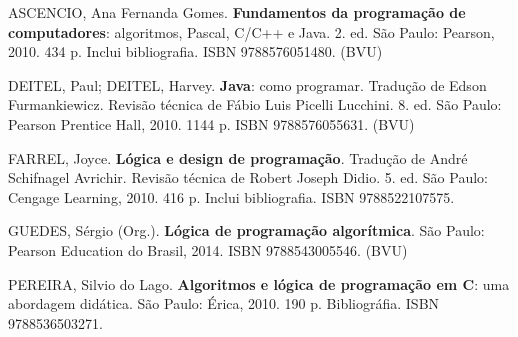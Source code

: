 \begin{pud}
\begin{bibbasica}
	\end{bibbasica}
	
	\begin{bibcomplementar}
	
		\item ASCENCIO, Ana Fernanda Gomes. \textbf{Fundamentos da programação de computadores}: algoritmos, Pascal, C/C++ e Java. 2. ed. São Paulo: Pearson, 2010. 434 p. Inclui bibliografia. ISBN 9788576051480.
 (BVU)
		\item DEITEL, Paul; DEITEL, Harvey. \textbf{Java}: como programar. Tradução de Edson Furmankiewicz. Revisão técnica de Fábio Luis Picelli Lucchini. 8. ed. São Paulo: Pearson Prentice Hall, 2010. 1144 p. ISBN 9788576055631. (BVU)
	    	

    	\item FARREL, Joyce. \textbf{Lógica e design de programação}. Tradução de André Schifnagel Avrichir. Revisão técnica de Robert Joseph Didio. 5. ed. São Paulo: Cengage Learning, 2010. 416 p. Inclui bibliografia. ISBN 9788522107575.
    	\item GUEDES, Sérgio (Org.). \textbf{Lógica de programação algorítmica}. São Paulo: Pearson Education do Brasil, 2014.  ISBN 9788543005546. (BVU)
    	\item PEREIRA, Silvio do Lago. \textbf{Algoritmos e lógica de programação em C}: uma abordagem didática. São Paulo: Érica, 2010. 190 p. Bibliográfia. ISBN 9788536503271.
		
	\end{bibcomplementar}
\end{pud}




